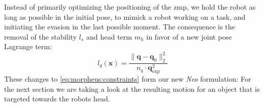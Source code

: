 Instead of primarily optimizing the positioning of the \acrshort{zmp}, we hold the robot as long as possible in the initial pose, to mimick a robot working on a task, and initiating the evasion in the last possible moment.
The consequence is the removal of the stability $l_s$ and head term $m_h$ in favor of a new joint pose Lagrange term:
\begin{equation}
    l_q(\bm x) = \frac{\| \bm q-\bm q_0 \|^2_2}{n_q \cdot \bm{q}_\text{exp}^2}
    \label{eq:neo:obj:joint}
\end{equation}
These changes to \cref{eq:morpheus:constraints} form our new \textit{Neo} formulation:
For the next section we are taking a look at the resulting motion for an object that is targeted towards the robots head.



